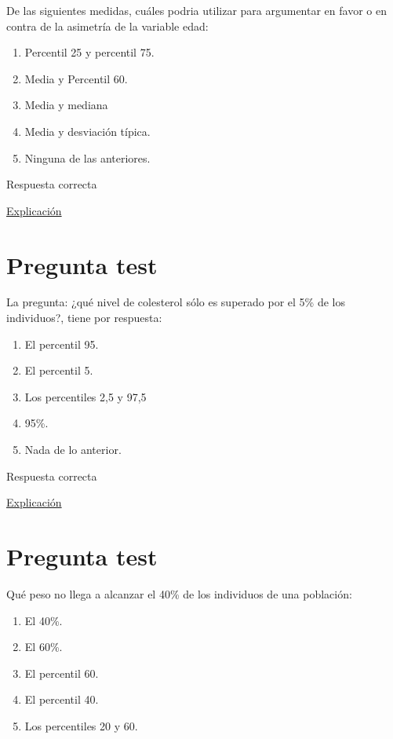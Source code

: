 \documentclass[
]{book}
\providecommand{\tightlist}{%
  \setlength{\itemsep}{0pt}\setlength{\parskip}{0pt}}
\begin{document}
De las siguientes medidas, cuáles podria utilizar para argumentar en favor o en contra de la asimetría de la variable edad:

\begin{enumerate}
\def\labelenumi{\alph{enumi})}
\tightlist
\item
  Percentil 25 y percentil 75.
\item
  Media y Percentil 60.
\item
  Media y mediana
\item
  Media y desviación típica.
\item
  Ninguna de las anteriores.
\end{enumerate}

Respuesta correcta

\href{https://1fjmanzano.github.io/bioestadistica/medidas-de-forma.html}{Explicación}

\hypertarget{pregunta-test-70}{%
\section{Pregunta test}\label{pregunta-test-70}}

La pregunta: ¿qué nivel de colesterol sólo es superado por el 5\% de los individuos?, tiene por respuesta:

\begin{enumerate}
\def\labelenumi{\alph{enumi})}
\tightlist
\item
  El percentil 95.
\item
  El percentil 5.
\item
  Los percentiles 2,5 y 97,5
\item
  95\%.
\item
  Nada de lo anterior.
\end{enumerate}

Respuesta correcta

\href{https://1fjmanzano.github.io/bioestadistica/medidas-de-posicio\%CC\%81n-dispersio\%CC\%81n-y-forma.html\#medidas-de-posicio\%CC\%81n-no-centrales}{Explicación}

\hypertarget{pregunta-test-71}{%
\section{Pregunta test}\label{pregunta-test-71}}

Qué peso no llega a alcanzar el 40\% de los individuos de una población:

\begin{enumerate}
\def\labelenumi{\alph{enumi})}
\tightlist
\item
  El 40\%.
\item
  El 60\%.
\item
  El percentil 60.
\item
  El percentil 40.
\item
  Los percentiles 20 y 60.
\end{enumerate}
\end{document}
